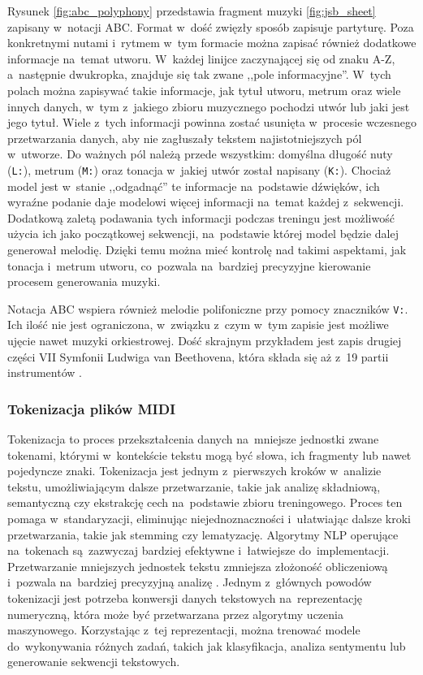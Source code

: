 \documentclass[data-science]{agh-wi} %
\begin{document}
Rysunek \ref*{fig:abc_polyphony} przedstawia fragment muzyki \ref*{fig:jsb_sheet} zapisany w~notacji ABC. Format w~dość zwięzły sposób zapisuje partyturę. Poza konkretnymi nutami i~rytmem w~tym formacie można zapisać również dodatkowe informacje na~temat utworu. W~każdej linijce zaczynającej się od znaku A-Z, a~następnie dwukropka, znajduje się tak zwane ,,pole informacyjne''. W~tych polach można zapisywać takie informacje, jak tytuł utworu, metrum oraz wiele innych danych, w~tym z~jakiego zbioru muzycznego pochodzi utwór lub jaki jest jego tytuł. Wiele z~tych informacji powinna zostać usunięta w~procesie wczesnego przetwarzania danych, aby nie zagłuszały tekstem najistotniejszych pól w~utworze. Do ważnych pól należą przede wszystkim: domyślna długość nuty (\texttt{L:}), metrum (\texttt{M:}) oraz tonacja w~jakiej utwór został napisany (\texttt{K:}). Chociaż model jest w~stanie ,,odgadnąć'' te informacje na~podstawie dźwięków, ich wyraźne podanie daje modelowi więcej informacji na~temat każdej z~sekwencji. Dodatkową zaletą podawania tych informacji podczas treningu jest możliwość użycia ich jako początkowej sekwencji, na~podstawie której model będzie dalej generował melodię. Dzięki temu można mieć kontrolę nad takimi aspektami, jak tonacja i~metrum utworu, co~pozwala na~bardziej precyzyjne kierowanie procesem generowania muzyki.

Notacja ABC wspiera również melodie polifoniczne przy pomocy znaczników \texttt{V:}. Ich ilość nie jest ograniczona, w~związku z~czym w~tym zapisie jest możliwe ujęcie nawet muzyki orkiestrowej. Dość skrajnym przykładem jest zapis drugiej części VII Symfonii Ludwiga van Beethovena, która składa się aż z~19 partii instrumentów \cite{beethoven}.

\subsubsection*{Tokenizacja plików MIDI}\label{sec:REMI}
Tokenizacja to proces przekształcenia danych na~mniejsze jednostki zwane tokenami, którymi w~kontekście tekstu mogą być słowa, ich fragmenty lub nawet pojedyncze znaki. Tokenizacja jest jednym z~pierwszych kroków w~analizie tekstu, umożliwiającym dalsze przetwarzanie, takie jak analizę składniową, semantyczną czy ekstrakcję cech na~podstawie zbioru treningowego. Proces ten pomaga w~standaryzacji, eliminując niejednoznaczności i~ułatwiając dalsze kroki przetwarzania, takie jak stemming czy lematyzację. Algorytmy NLP operujące na~tokenach są~zazwyczaj bardziej efektywne i~łatwiejsze do~implementacji. Przetwarzanie mniejszych jednostek tekstu zmniejsza złożoność obliczeniową i~pozwala na~bardziej precyzyjną analizę \cite*{tokenizacja}. Jednym z~głównych powodów tokenizacji jest potrzeba konwersji danych tekstowych na~reprezentację numeryczną, która może być przetwarzana przez algorytmy uczenia maszynowego. Korzystając z~tej reprezentacji, można trenować modele do~wykonywania różnych zadań, takich jak klasyfikacja, analiza sentymentu lub generowanie sekwencji tekstowych.
\end{document}
